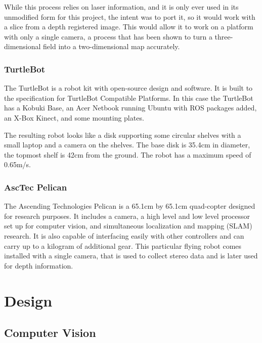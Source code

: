 \documentclass{article}[12]
\begin{document}
		While this process relies on laser information, and it is only ever used in its unmodified form for this project, the intent was to port it, so it would work with a slice from a depth registered image. This would allow it to work on a platform with only a single camera, a process that has been shown to turn a three-dimensional field into a two-dimensional map accurately.\cite{2018nanomap}
		
		
		\subsubsection{TurtleBot}
		
		The TurtleBot is a robot kit with open-source design and software. It is built to the specification for TurtleBot Compatible Platforms. \cite{wise_foote_2011} In this case the TurtleBot has a Kobuki Base, an Acer Netbook running Ubuntu with ROS packages added, an X-Box Kinect, and some mounting plates. 
		
		The resulting robot looks like a disk supporting some circular shelves with a small laptop and a camera on the shelves. The base disk is 35.4cm in diameter, the topmost shelf is 42cm from the ground. The robot has a maximum speed of 0.65m/s. 
		
		\subsubsection{AscTec Pelican}
		
		The Ascending Technologies Pelican is a 65.1cm by 65.1cm quad-copter designed for research purposes.\cite{asctec} It includes a camera, a high level and low level processor set up for computer vision, and simultaneous localization and mapping (SLAM) research. It is also capable of interfacing easily with other controllers and can carry up to a kilogram of additional gear. This particular flying robot comes installed with a single camera, that is used to collect stereo data and is later used for depth information.

		
\section{Design}
	
	\subsection{Computer Vision}
	
\end{document}
